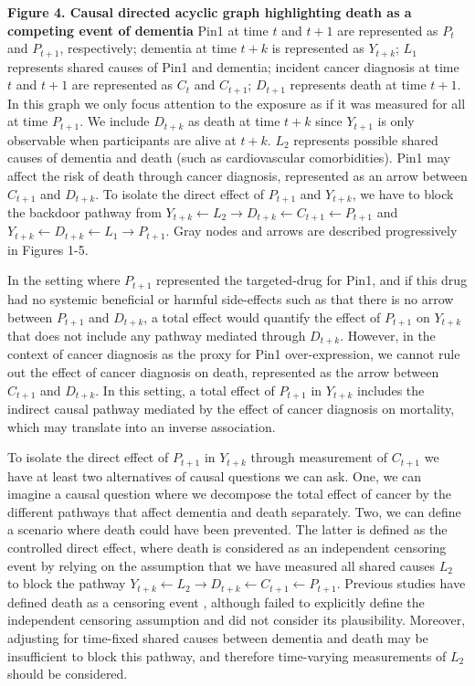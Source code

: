 \documentclass[
]{book}
\begin{document}
\textbf{Figure 4. Causal directed acyclic graph highlighting death as a competing event of dementia} Pin1 at time \(t\) and \(t+1\) are represented as \(P_t\) and \(P_{t+1}\), respectively; dementia at time \(t+k\) is represented as \(Y_{t+k}\); \(L_1\) represents shared causes of Pin1 and dementia; incident cancer diagnosis at time \(t\) and \(t+1\) are represented as \(C_t\) and \(C_{t+1}\); \(D_{t+1}\) represents death at time \(t+1\). In this graph we only focus attention to the exposure as if it was measured for all at time \(P_{t+1}\). We include \(D_{t+k}\) as death at time \(t+k\) since \(Y_{t+1}\) is only observable when participants are alive at \(t+k\). \(L_2\) represents possible shared causes of dementia and death (such as cardiovascular comorbidities). Pin1 may affect the risk of death through cancer diagnosis, represented as an arrow between \(C_{t+1}\) and \(D_{t+k}\). To isolate the direct effect of \(P_{t+1}\) and \(Y_{t+k}\), we have to block the backdoor pathway from \(Y_{t+k} \leftarrow L_2 \rightarrow D_{t+k} \leftarrow C_{t+1} \leftarrow P_{t+1}\) and \(Y_{t+k} \leftarrow D_{t+k} \leftarrow L_1 \rightarrow P_{t+1}\). Gray nodes and arrows are described progressively in Figures 1-5.

In the setting where \(P_{t+1}\) represented the targeted-drug for Pin1, and if this drug had no systemic beneficial or harmful side-effects such as that there is no arrow between \(P_{t+1}\) and \(D_{t+k}\), a total effect would quantify the effect of \(P_{t+1}\) on \(Y_{t+k}\) that does not include any pathway mediated through \(D_{t+k}\)\autocite{young2020}. However, in the context of cancer diagnosis as the proxy for Pin1 over-expression, we cannot rule out the effect of cancer diagnosis on death, represented as the arrow between \(C_{t+1}\) and \(D_{t+k}\). In this setting, a total effect of \(P_{t+1}\) in \(Y_{t+k}\) includes the indirect causal pathway mediated by the effect of cancer diagnosis on mortality, which may translate into an inverse association\autocite{young2020}.

To isolate the direct effect of \(P_{t+1}\) in \(Y_{t+k}\) through measurement of \(C_{t+1}\) we have at least two alternatives of causal questions we can ask. One, we can imagine a causal question where we decompose the total effect of cancer by the different pathways that affect dementia and death separately\autocite{stensrud2020}. Two, we can define a scenario where death could have been prevented. The latter is defined as the controlled direct effect, where death is considered as an independent censoring event by relying on the assumption that we have measured all shared causes \(L_2\) to block the pathway \(Y_{t+k} \leftarrow L_2 \rightarrow D_{t+k} \leftarrow C_{t+1} \leftarrow P_{t+1}\). Previous studies have defined death as a censoring event \autocite{frain2017}, although failed to explicitly define the independent censoring assumption and did not consider its plausibility. Moreover, adjusting for time-fixed shared causes between dementia and death may be insufficient to block this pathway, and therefore time-varying measurements of \(L_2\) should be considered.
\end{document}
